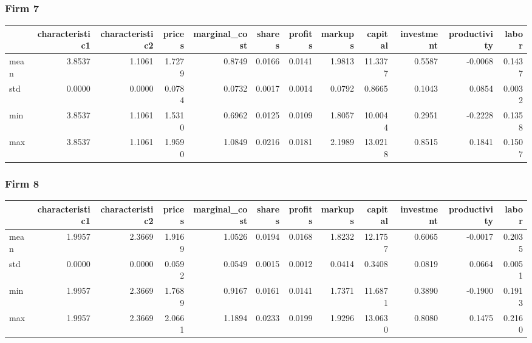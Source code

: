  \subsubsection*{Firm 7}
\begin{tabular}{lrrrrrrrrrrr}
\toprule
{} &  characteristic1 &  characteristic2 &  prices &  marginal\_cost &  shares &  profits &  markups &  capital &  investment &  productivity &  labor \\
\midrule
mean &           3.8537 &           1.1061 &  1.7279 &         0.8749 &  0.0166 &   0.0141 &   1.9813 &  11.3377 &      0.5587 &       -0.0068 & 0.1437 \\
std  &           0.0000 &           0.0000 &  0.0784 &         0.0732 &  0.0017 &   0.0014 &   0.0792 &   0.8665 &      0.1043 &        0.0854 & 0.0032 \\
min  &           3.8537 &           1.1061 &  1.5310 &         0.6962 &  0.0125 &   0.0109 &   1.8057 &  10.0044 &      0.2951 &       -0.2228 & 0.1358 \\
max  &           3.8537 &           1.1061 &  1.9590 &         1.0849 &  0.0216 &   0.0181 &   2.1989 &  13.0218 &      0.8515 &        0.1841 & 0.1507 \\
\bottomrule
\end{tabular}


 \subsubsection*{Firm 8}
\begin{tabular}{lrrrrrrrrrrr}
\toprule
{} &  characteristic1 &  characteristic2 &  prices &  marginal\_cost &  shares &  profits &  markups &  capital &  investment &  productivity &  labor \\
\midrule
mean &           1.9957 &           2.3669 &  1.9169 &         1.0526 &  0.0194 &   0.0168 &   1.8232 &  12.1757 &      0.6065 &       -0.0017 & 0.2035 \\
std  &           0.0000 &           0.0000 &  0.0592 &         0.0549 &  0.0015 &   0.0012 &   0.0414 &   0.3408 &      0.0819 &        0.0664 & 0.0051 \\
min  &           1.9957 &           2.3669 &  1.7689 &         0.9167 &  0.0161 &   0.0141 &   1.7371 &  11.6871 &      0.3890 &       -0.1900 & 0.1913 \\
max  &           1.9957 &           2.3669 &  2.0661 &         1.1894 &  0.0233 &   0.0199 &   1.9296 &  13.0630 &      0.8080 &        0.1475 & 0.2160 \\
\bottomrule
\end{tabular}



